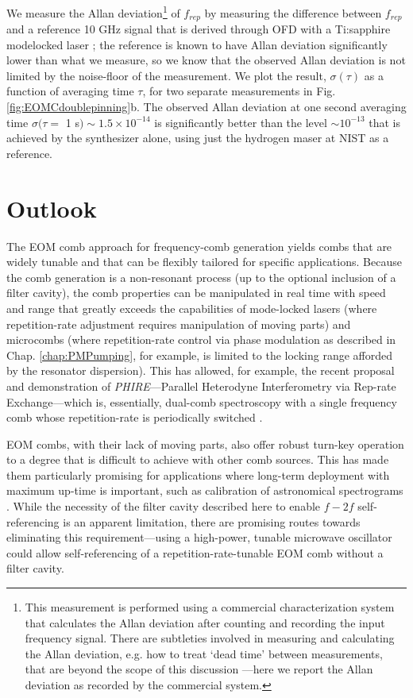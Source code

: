 We measure the Allan deviation\footnote{This measurement is performed using a commercial characterization system that calculates the Allan deviation after counting and recording the input frequency signal. There are subtleties involved in measuring and calculating the Allan deviation, e.g. how to treat `dead time' between measurements, that are beyond the scope of this discussion \cite{Levine1999}---here we report the Allan deviation as recorded by the commercial system.} of $f_{rep}$ by measuring the difference between $f_{rep}$ and a reference 10 GHz signal that is derived through OFD with a Ti:sapphire modelocked laser \cite{Fortier2011}; the reference is known to have Allan deviation significantly lower than what we measure, so we know that the observed Allan deviation is not limited by the noise-floor of the measurement. We plot the result, $\sigma(\tau)$ as a function of averaging time $\tau$, for two separate measurements in Fig. \ref{fig:EOMCdoublepinning}b. The observed Allan deviation at one second averaging time $\sigma(\tau=$ 1 s$)\sim1.5\times10^{-14}$ is significantly better than the level $\sim10^{-13}$ that is achieved by the synthesizer alone, using just the hydrogen maser at NIST as a reference.



\section{Outlook}
The EOM comb approach for frequency-comb generation yields combs that are widely tunable and that can be flexibly tailored for specific applications. Because the comb generation is a non-resonant process (up to the optional inclusion of a filter cavity), the comb properties can be manipulated in real time with speed and range that greatly exceeds the capabilities of mode-locked lasers (where repetition-rate adjustment requires manipulation of moving parts) and microcombs (where repetition-rate control via phase modulation as described in Chap. \ref{chap:PMPumping}, for example, is limited to the locking range afforded by the resonator dispersion). This has allowed, for example, the recent proposal and demonstration of \textit{PHIRE}---Parallel Heterodyne Interferometry via Rep-rate Exchange---which is, essentially, dual-comb spectroscopy \cite{Coddington2016} with a single frequency comb whose repetition-rate is periodically switched \cite{Carlson2018}. 

EOM combs, with their lack of moving parts, also offer robust turn-key operation to a degree that is difficult to achieve with other comb sources. This has made them particularly promising for applications where long-term deployment with maximum up-time is important, such as calibration of astronomical spectrograms \cite{Metcalf2018}. While the necessity of the filter cavity described here to enable $f-2f$ self-referencing is an apparent limitation, there are promising routes towards eliminating this requirement---using a high-power, tunable microwave oscillator could allow self-referencing of a repetition-rate-tunable EOM comb without a filter cavity.

